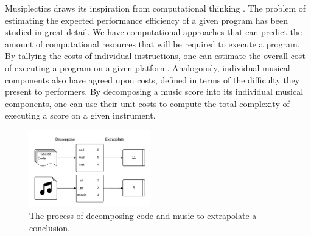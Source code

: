 \documentclass[10pt,preprint]{sigplanconf}
\begin{document}
Musiplectics draws its inspiration from computational thinking \cite{wing2006computational}. The problem of estimating the expected performance efficiency of a given program has been studied in great detail. We have computational approaches that can predict the amount of computational resources that will be required to execute a program. By tallying the costs of individual instructions, one can estimate the overall cost of executing a program on a given platform. Analogously, individual musical components also have agreed upon costs, defined in terms of the difficulty they present to performers. By decomposing a music score into its individual musical components, one can use their unit costs to compute the total complexity of executing a score on a given instrument.



\begin{figure}[ht!]
	\centering
		\includegraphics[width=0.47\textwidth]{ComputationalThinkingAnalogy.png}
		\caption{The process of decomposing code and music to extrapolate a conclusion.}
		\label{image:analogy}
\end{figure} 
\end{document}
